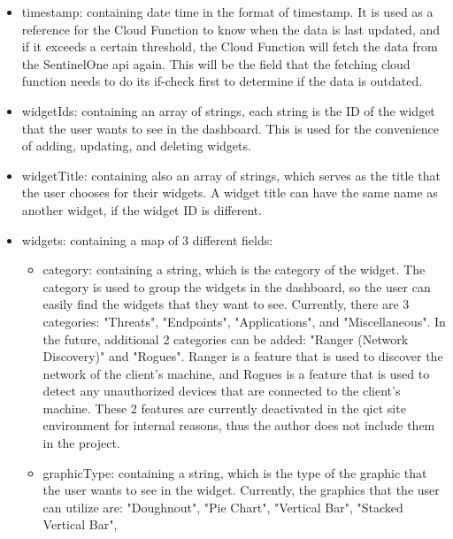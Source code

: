 \begin{multicols}{2}
      \begin{itemize}
            \item timestamp: containing date time in the format of timestamp. It is used as a reference for the Cloud Function to know when
                  the data is last updated, and if it exceeds a certain threshold, the Cloud Function will fetch the data from the SentinelOne
                  \acrshort{api} again. This will be the field that the fetching cloud function needs to do its if-check first to determine if
                  the data is outdated.
            \item widgetIds: containing an array of strings, each string is the ID of the widget that the user wants to see in the dashboard.
                  This is used for the convenience of adding, updating, and deleting widgets.
            \item widgetTitle: containing also an array of strings, which serves as the title that the user chooses for their widgets. A widget
                  title can have the same name as another widget, if the widget ID is different.
            \item widgets: containing a map of 3 different fields:
                  \begin{itemize}
                        \item category: containing a string, which is the category of the widget. The category is used to group the widgets in the
                              dashboard, so the user can easily find the widgets that they want to see. Currently, there are 3 categories: "Threats",
                              "Endpoints", "Applications", and "Miscellaneous". In the future, additional 2 categories can be added: "Ranger
                              (Network Discovery)" and "Rogues". Ranger is a feature that is used to discover the network of the client's machine,
                              and Rogues is a feature that is used to detect any unauthorized devices that are connected to the client's machine.
                              These 2 features are currently deactivated in the \acrshort{qict} site environment for internal reasons, thus the
                              author does not include them in the project.
                        \item graphicType: containing a string, which is the type of the graphic that the user wants to see in the widget. Currently,
                              the graphics that the user can utilize are: "Doughnout", "Pie Chart", "Vertical Bar", "Stacked Vertical Bar",

\end{itemize}
\end{itemize}
\end{multicols}
